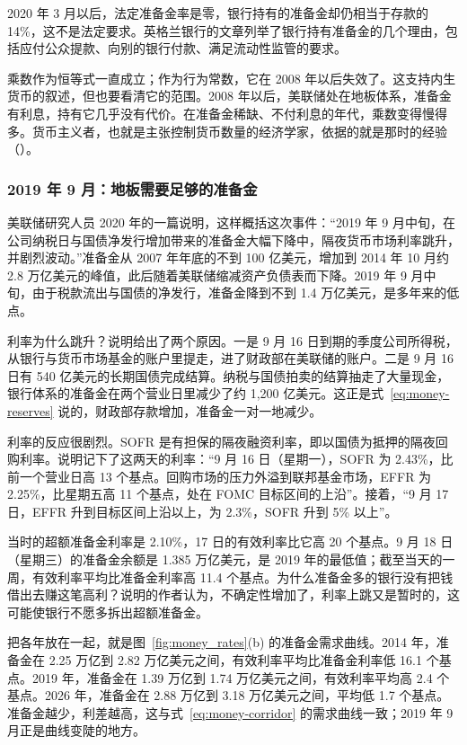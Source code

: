 2020 年 3 月以后，法定准备金率是零，银行持有的准备金却仍相当于存款的 14\%，这不是法定要求。英格兰银行的文章列举了银行持有准备金的几个理由，包括应付公众提款、向别的银行付款、满足流动性监管的要求\cite{mcleay2014}。

乘数作为恒等式一直成立；作为行为常数，它在 2008 年以后失效了。这支持内生货币的叙述，但也要看清它的范围。2008 年以后，美联储处在地板体系，准备金有利息，持有它几乎没有代价。在准备金稀缺、不付利息的年代，乘数变得慢得多。货币主义者，也就是主张控制货币数量的经济学家，依据的就是那时的经验（）。

\subsubsection{2019 年 9 月：地板需要足够的准备金}
美联储研究人员 2020 年的一篇说明，这样概括这次事件：“2019 年 9 月中旬，在公司纳税日与国债净发行增加带来的准备金大幅下降中，隔夜货币市场利率跳升，并剧烈波动。”\cite{anbil2020}准备金从 2007 年年底的不到 100 亿美元，增加到 2014 年 10 月约 2.8 万亿美元的峰值，此后随着美联储缩减资产负债表而下降。2019 年 9 月中旬，由于税款流出与国债的净发行，准备金降到不到 1.4 万亿美元，是多年来的低点\cite{anbil2020}。

利率为什么跳升？说明给出了两个原因。一是 9 月 16 日到期的季度公司所得税，从银行与货币市场基金的账户里提走，进了财政部在美联储的账户。二是 9 月 16 日有 540 亿美元的长期国债完成结算。纳税与国债拍卖的结算抽走了大量现金，银行体系的准备金在两个营业日里减少了约 1,200 亿美元\cite{anbil2020}。这正是式~\eqref{eq:money-reserves} 说的，财政部存款增加，准备金一对一地减少。

利率的反应很剧烈。SOFR 是有担保的隔夜融资利率，即以国债为抵押的隔夜回购利率。说明记下了这两天的利率：“9 月 16 日（星期一），SOFR 为 2.43\%，比前一个营业日高 13 个基点。回购市场的压力外溢到联邦基金市场，EFFR 为 2.25\%，比星期五高 11 个基点，处在 FOMC 目标区间的上沿”。接着，“9 月 17 日，EFFR 升到目标区间上沿以上，为 2.3\%，SOFR 升到 5\% 以上”\cite{anbil2020}。

当时的超额准备金利率是 2.10\%，17 日的有效利率比它高 20 个基点。9 月 18 日（星期三）的准备金余额是 1.385 万亿美元，是 2019 年的最低值；截至当天的一周，有效利率平均比准备金利率高 11.4 个基点\cite{fred2026m}。为什么准备金多的银行没有把钱借出去赚这笔高利？说明的作者认为，不确定性增加了，利率上跳又是暂时的，这可能使银行不愿多拆出超额准备金\cite{anbil2020}。

把各年放在一起，就是图~\ref{fig:money_rates}(b) 的准备金需求曲线。2014 年，准备金在 2.25 万亿到 2.82 万亿美元之间，有效利率平均比准备金利率低 16.1 个基点。2019 年，准备金在 1.39 万亿到 1.74 万亿美元之间，有效利率平均高 2.4 个基点。2026 年，准备金在 2.88 万亿到 3.18 万亿美元之间，平均低 1.7 个基点\cite{fred2026m}。准备金越少，利差越高，这与式~\eqref{eq:money-corridor} 的需求曲线一致；2019 年 9 月正是曲线变陡的地方。


